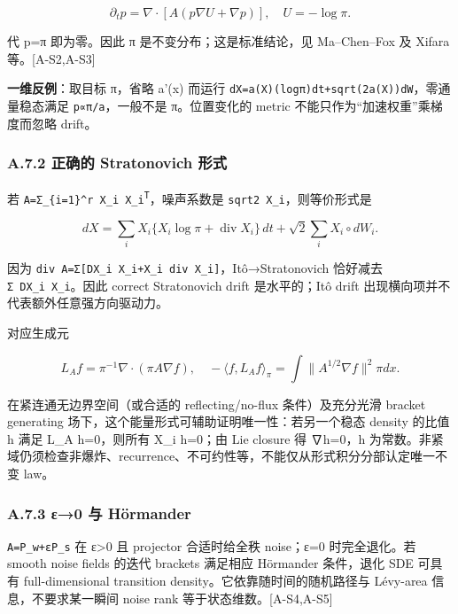 \documentclass[
  11pt,
  a4paper,
]{article}
\begin{document}
\[
\partial_t p=\nabla\cdot[A(p\nabla U+\nabla p)],\quad U=-\log\pi.
\]

代 p=π 即为零。因此 π 是不变分布；这是标准结论，见 Ma--Chen--Fox 及
Xifara 等。{[}A-S2,A-S3{]}

\textbf{一维反例}：取目标 π，省略 a'(x) 而运行
\texttt{dX=a(X)(logπ)\textquotesingle{}dt+sqrt(2a(X))dW}，零通量稳态满足
\texttt{p∝π/a}，一般不是 π。位置变化的 metric
不能只作为``加速权重''乘梯度而忽略 drift。

\hypertarget{a.7.2-ux6b63ux786eux7684-stratonovich-ux5f62ux5f0f}{%
\subsubsection{A.7.2 正确的 Stratonovich
形式}\label{a.7.2-ux6b63ux786eux7684-stratonovich-ux5f62ux5f0f}}

若 \texttt{A=Σ\_\allowbreak{}\{i=1\}\^{}r\ X\_\allowbreak{}i\ X\_\allowbreak{}i\textsuperscript{T}}，噪声系数是
\texttt{sqrt2\ X\_\allowbreak{}i}，则等价形式是

\[
dX=\sum_iX_i\{X_i\log\pi+\operatorname{div}X_i\}\,dt
 +\sqrt2\sum_iX_i\circ dW_i.\tag{G3}
\]

因为
\texttt{div\ A=Σ{[}DX\_\allowbreak{}i\ X\_\allowbreak{}i+X\_\allowbreak{}i\ div\ X\_\allowbreak{}i{]}}，Itô→Stratonovich
恰好减去 \texttt{Σ\ DX\_\allowbreak{}i\ X\_\allowbreak{}i}。因此 correct Stratonovich drift
是水平的；Itô drift 出现横向项并不代表额外任意强方向驱动力。

对应生成元

\[
L_Af=\pi^{-1}\nabla\cdot(\pi A\nabla f),
\quad
-\langle f,L_Af\rangle_\pi=\int\|A^{1/2}\nabla f\|^2\pi dx.
\]

在紧连通无边界空间（或合适的 reflecting/no-flux 条件）及充分光滑 bracket
generating 场下，这个能量形式可辅助证明唯一性：若另一个稳态 density
的比值 h 满足 L\_\allowbreak{}A h=0，则所有 X\_\allowbreak{}i h=0；由 Lie closure 得 ∇h=0，h
为常数。非紧域仍须检查非爆炸、recurrence、不可约性等，不能仅从形式积分分部认定唯一不变
law。

\hypertarget{a.7.3-ux3b50-ux4e0e-huxf6rmander}{%
\subsubsection{A.7.3 ε→0 与
Hörmander}\label{a.7.3-ux3b50-ux4e0e-huxf6rmander}}

\texttt{A=P\_\allowbreak{}w+εP\_\allowbreak{}s} 在 ε\textgreater0 且 projector 合适时给全秩
noise；ε=0 时完全退化。若 smooth noise fields 的迭代 brackets 满足相应
Hörmander 条件，退化 SDE 可具有 full-dimensional transition
density。它依靠随时间的随机路径与 Lévy-area 信息，不要求某一瞬间 noise
rank 等于状态维数。{[}A-S4,A-S5{]}
\end{document}

